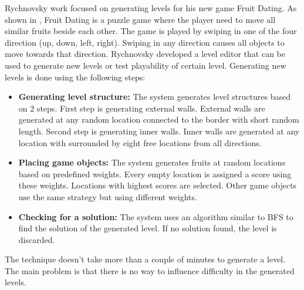Rychnovsky\cite{fruitDatingPCG} work focused on generating levels for his new game Fruit Dating. As shown in , Fruit Dating is a puzzle game where the player need to move all similar fruits beside each other. The game is played by swiping in one of the four direction (up, down, left, right). Swiping in any direction causes all objects to move towards that direction. Rychnovsky developed a level editor that can be used to generate new levels or test playability of certain level. Generating new levels is done using the following steps: 
\begin{itemize} \itemsep0pt \parskip0pt 
	\item \textbf{Generating level structure:} The system generates level structures based on 2 steps. First step is generating external walls. External walls are generated at any random location connected to the border with short random length. Second step is generating inner walls. Inner walls are generated at any location with surrounded by eight free locations from all directions.
	\item \textbf{Placing game objects:} The system generates fruits at random locations based on predefined weights. Every empty location is assigned a score using these weights. Locations with highest scores are selected. Other game objects use the same strategy but using different weights.
	\item \textbf{Checking for a solution:} The system uses an algorithm similar to BFS to find the solution of the generated level. If no solution found, the level is discarded.
\end{itemize}
The technique doesn't take more than a couple of minutes to generate a level. The main problem is that there is no way to influence difficulty in the generated levels.


